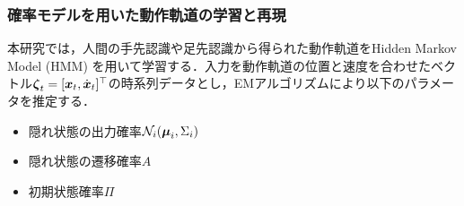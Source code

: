 \documentclass[twocolumn]{preport}
\def\vector#1{\mbox{\boldmath $#1$}}
\begin{document}

\subsubsection{確率モデルを用いた動作軌道の学習と再現}
本研究では，人間の手先認識や足先認識から得られた動作軌道をHidden Markov Model (HMM) を用いて学習する．入力を動作軌道の位置と速度を合わせたベクトル\(\vector{\zeta}_t = [\vector{x}_t, \dot{\vector{x}}_t]^\top\)の時系列データとし，EMアルゴリズムにより以下のパラメータを推定する．
\begin{itemize}
  \item 隠れ状態の出力確率\(\mathcal{N}_i(\vector{\mu}_i, \Sigma_i)\)
  \item 隠れ状態の遷移確率\(A\)
  \item 初期状態確率\(\Pi\)
\end{itemize}
\end{document}
